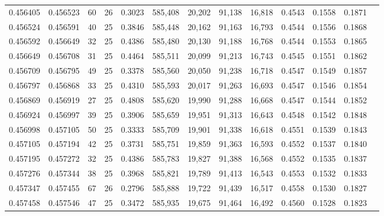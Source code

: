 \begin{tabular}{rrrrrrrrrrrrr}
0.456405 & 0.456523 &    60 &  26 &                                     0.3023 & 585,408 &  20,202 &  91,138 &  16,818 & 0.4543 & 0.1558 & 0.1871 \\
0.456524 & 0.456591 &    40 &  25 &                                     0.3846 & 585,448 &  20,162 &  91,163 &  16,793 & 0.4544 & 0.1556 & 0.1868 \\
0.456592 & 0.456649 &    32 &  25 &                                     0.4386 & 585,480 &  20,130 &  91,188 &  16,768 & 0.4544 & 0.1553 & 0.1865 \\
0.456649 & 0.456708 &    31 &  25 &                                     0.4464 & 585,511 &  20,099 &  91,213 &  16,743 & 0.4545 & 0.1551 & 0.1862 \\
0.456709 & 0.456795 &    49 &  25 &                                     0.3378 & 585,560 &  20,050 &  91,238 &  16,718 & 0.4547 & 0.1549 & 0.1857 \\
0.456797 & 0.456868 &    33 &  25 &                                     0.4310 & 585,593 &  20,017 &  91,263 &  16,693 & 0.4547 & 0.1546 & 0.1854 \\
0.456869 & 0.456919 &    27 &  25 &                                     0.4808 & 585,620 &  19,990 &  91,288 &  16,668 & 0.4547 & 0.1544 & 0.1852 \\
0.456924 & 0.456997 &    39 &  25 &                                     0.3906 & 585,659 &  19,951 &  91,313 &  16,643 & 0.4548 & 0.1542 & 0.1848 \\
0.456998 & 0.457105 &    50 &  25 &                                     0.3333 & 585,709 &  19,901 &  91,338 &  16,618 & 0.4551 & 0.1539 & 0.1843 \\
0.457105 & 0.457194 &    42 &  25 &                                     0.3731 & 585,751 &  19,859 &  91,363 &  16,593 & 0.4552 & 0.1537 & 0.1840 \\
0.457195 & 0.457272 &    32 &  25 &                                     0.4386 & 585,783 &  19,827 &  91,388 &  16,568 & 0.4552 & 0.1535 & 0.1837 \\
0.457276 & 0.457344 &    38 &  25 &                                     0.3968 & 585,821 &  19,789 &  91,413 &  16,543 & 0.4553 & 0.1532 & 0.1833 \\
0.457347 & 0.457455 &    67 &  26 &                                     0.2796 & 585,888 &  19,722 &  91,439 &  16,517 & 0.4558 & 0.1530 & 0.1827 \\
0.457458 & 0.457546 &    47 &  25 &                                     0.3472 & 585,935 &  19,675 &  91,464 &  16,492 & 0.4560 & 0.1528 & 0.1823 \\

\end{tabular}
